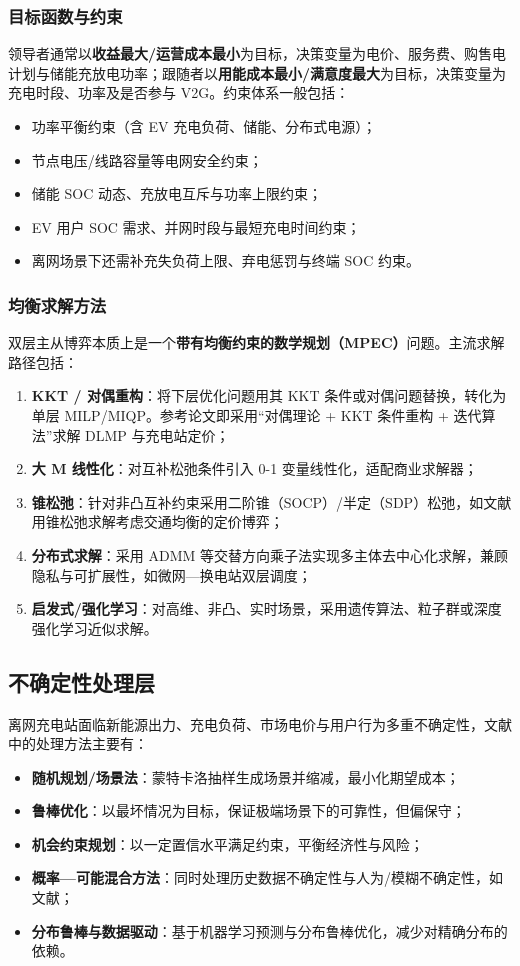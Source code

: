 \documentclass[UTF8,a4paper,11pt]{ctexart}
\begin{document}
\subsubsection{目标函数与约束}
领导者通常以\textbf{收益最大/运营成本最小}为目标，决策变量为电价、服务费、购售电计划与储能充放电功率；跟随者以\textbf{用能成本最小/满意度最大}为目标，决策变量为充电时段、功率及是否参与 V2G。约束体系一般包括：
\begin{itemize}
  \item 功率平衡约束（含 EV 充电负荷、储能、分布式电源）；
  \item 节点电压/线路容量等电网安全约束；
  \item 储能 SOC 动态、充放电互斥与功率上限约束；
  \item EV 用户 SOC 需求、并网时段与最短充电时间约束；
  \item 离网场景下还需补充失负荷上限、弃电惩罚与终端 SOC 约束。
\end{itemize}

\subsubsection{均衡求解方法}
双层主从博弈本质上是一个\textbf{带有均衡约束的数学规划（MPEC）}问题。主流求解路径包括：
\begin{enumerate}
  \item \textbf{KKT / 对偶重构}：将下层优化问题用其 KKT 条件或对偶问题替换，转化为单层 MILP/MIQP。参考论文即采用“对偶理论 + KKT 条件重构 + 迭代算法”求解 DLMP 与充电站定价\cite{ref1}；
  \item \textbf{大 M 线性化}：对互补松弛条件引入 0-1 变量线性化，适配商业求解器；
  \item \textbf{锥松弛}：针对非凸互补约束采用二阶锥（SOCP）/半定（SDP）松弛，如文献\cite{ref4}用锥松弛求解考虑交通均衡的定价博弈；
  \item \textbf{分布式求解}：采用 ADMM 等交替方向乘子法实现多主体去中心化求解，兼顾隐私与可扩展性，如微网—换电站双层调度\cite{ref7}；
  \item \textbf{启发式/强化学习}：对高维、非凸、实时场景，采用遗传算法、粒子群或深度强化学习近似求解\cite{ref15}。
\end{enumerate}

\subsection{不确定性处理层}
离网充电站面临新能源出力、充电负荷、市场电价与用户行为多重不确定性，文献中的处理方法主要有：
\begin{itemize}
  \item \textbf{随机规划/场景法}：蒙特卡洛抽样生成场景并缩减，最小化期望成本；
  \item \textbf{鲁棒优化}：以最坏情况为目标，保证极端场景下的可靠性，但偏保守；
  \item \textbf{机会约束规划}：以一定置信水平满足约束，平衡经济性与风险；
  \item \textbf{概率—可能混合方法}：同时处理历史数据不确定性与人为/模糊不确定性，如文献\cite{ref7}；
  \item \textbf{分布鲁棒与数据驱动}：基于机器学习预测与分布鲁棒优化，减少对精确分布的依赖。
\end{itemize}
\end{document}
